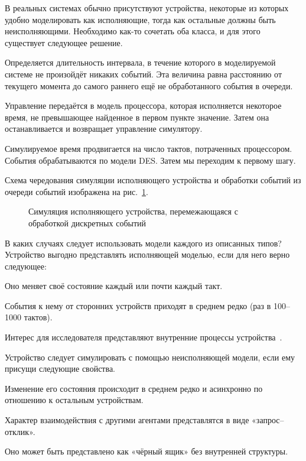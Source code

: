 В реальных системах обычно присутствуют устройства, некоторые из которых удобно моделировать как исполняющие, тогда как остальные должны быть неисполняющими. Необходимо как-то сочетать оба класса, и для этого существует следующее решение.

\begin{enumerate*}
\item Определяется длительность интервала, в течение которого в моделируемой системе не произойдёт никаких событий. Эта величина равна расстоянию от текущего момента до самого раннего ещё не обработанного события в очереди.

\item Управление передаётся в модель процессора, которая исполняется  некоторое время, не превышающее найденное в первом пункте значение. Затем она останавливается и возвращает управление симулятору.

\item Симулируемое время продвигается на число тактов, потраченных процессором. События обрабатываются по модели DES. Затем мы переходим к первому шагу.
\end{enumerate*}

Схема чередования симуляции исполняющего устройства и обработки событий из очереди событий изображена на рис. \ref{fig:queue2}.

\begin{figure}[htb]
    \centering
    \caption{Симуляция исполняющего устройства, перемежающаяся с обработкой дискретных событий}
    \label{fig:queue2}
\end{figure}

В каких случаях следует использовать модели каждого из описанных типов? Устройство выгодно представлять исполняющей моделью, если для него верно следующее:
\begin{enumerate*}
    \item Оно меняет своё состояние каждый или почти каждый такт.
    \item События к нему от сторонних устройств приходят в среднем редко (раз в 100–1000 тактов).
    \item Интерес для исследователя представляют внутренние процессы устройства~\cite{fritzson2004principles}.
\end{enumerate*}

Устройство следует симулировать с помощью неисполняющей модели, если ему присущи следующие свойства.
\begin{enumerate*}
    \item Изменение его состояния происходит в среднем редко и асинхронно по отношению к остальным устройствам.
    \item Характер взаимодействия с другими агентами представлятся в виде «запрос–отклик».
    \item Оно может быть представлено как «чёрный ящик» без внутренней структуры.
\end{enumerate*}

